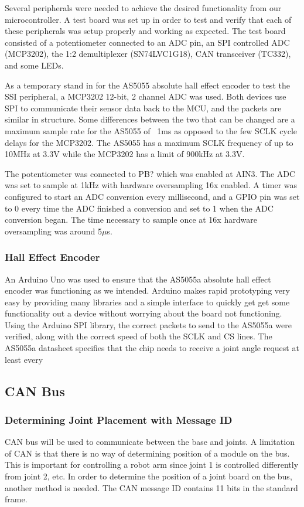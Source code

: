 \noindent Several peripherals were needed to achieve the desired functionality from our microcontroller. A test board was set up in order to test and verify that each of these peripherals was setup properly and working as expected. The test board consisted of a potentiometer connected to an ADC pin, an SPI controlled ADC (MCP3202), the 1:2 demultiplexer (SN74LVC1G18), CAN transceiver (TC332), and some LEDs.

\noindent As a temporary stand in for the AS5055 absolute hall effect encoder to test the SSI peripheral, a MCP3202 12-bit, 2 channel ADC was used. Both devices use SPI to communicate their sensor data back to the MCU, and the packets are similar in structure. Some differences between the two that can be changed are a maximum sample rate for the AS5055 of ~1ms as opposed to the few SCLK cycle delays for the MCP3202. The AS5055 has a maximum SCLK frequency of up to 10MHz at 3.3V while the MCP3202 has a limit of 900kHz at 3.3V. 

\noindent The potentiometer was connected to PB? which was enabled at AIN3. The ADC was set to sample at 1kHz with hardware oversampling 16x enabled. A timer was configured to start an ADC conversion every millisecond, and a GPIO pin was set to 0 every time the ADC finished a conversion and set to 1 when the ADC conversion began. The time necessary to sample once at 16x hardware oversampling was around 5$\mu$s.

\subsubsection{Hall Effect Encoder}
An Arduino Uno was used to ensure that the AS5055a absolute hall effect encoder was functioning as we intended. Arduino makes rapid prototyping very easy by providing many libraries and a simple interface to quickly get get some functionality out a device without worrying about the board not functioning. Using the Arduino SPI library, the correct packets to send to the AS5055a were verified, along with the correct speed of both the SCLK and CS lines. The AS5055a datasheet specifies that the chip needs to receive a joint angle request at least every

\subsection{CAN Bus}
\subsubsection{Determining Joint Placement with Message ID}
CAN bus will be used to communicate between the base and joints. A limitation of CAN is that there is no way of determining position of a module on the bus. This is important for controlling a robot arm since joint 1 is controlled differently from joint 2, etc. In order to determine the position of a joint board on the bus, another method is needed. The CAN message ID contains 11 bits in the standard frame.

